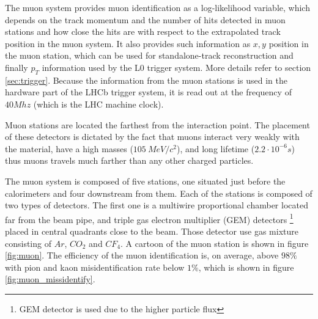 The muon system provides muon identification as a log-likelihood variable, which depends on the track momentum and the number of hits detected in muon stations and how close the hits are with respect to the extrapolated track position in the muon system. It also provides such information as $x,y$ position in the muon station, which can be used for standalone-track reconstruction and finally $p_T$ information used by the L0 trigger system. More details refer to section \ref{sec:trigger}. Because the information from the muon stations is used in the hardware part of the LHCb trigger system, it is read out at the frequency of $40 Mhz$ (which is the LHC machine clock). 

Muon stations are located the farthest from the interaction point. The placement of these detectors is dictated by the fact that muons interact very weakly with the material, have a high masses ($105~ MeV/c^2$), and long lifetime ($2.2 \cdot 10^{-6}s$) thus muons travels much farther than any other charged particles.  
  
The muon system is composed of five stations, one situated just before the calorimeters and four downstream from them. Each of the stations is composed of two types of detectors. The first one is a multiwire proportional chamber located far from the beam pipe, and triple gas electron multiplier (GEM) detectors \footnote{GEM detector is used due to the higher particle flux} placed in central quadrants close to the beam. Those detector use gas mixture consisting of $Ar$, $CO_2$ and $CF_4$. A cartoon of the muon station is shown in figure \ref{fig:muon}. 
The efficiency of the muon identification is, on average, above $98\%$ with pion and kaon misidentification rate below $1\%$, which is shown in figure \ref{fig:muon_missidentify}. 


